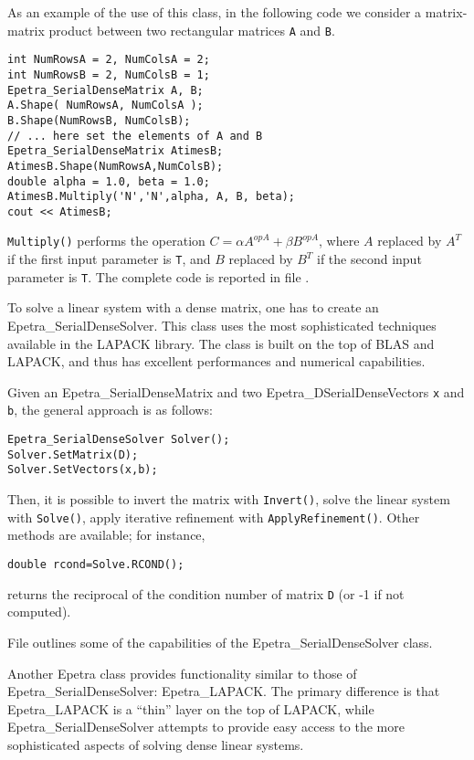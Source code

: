 As an example of the use of this class, in the following code we
consider a matrix-matrix product between two rectangular matrices
\verb!A! and \verb!B!. 
\begin{verbatim}
int NumRowsA = 2, NumColsA = 2;
int NumRowsB = 2, NumColsB = 1;
Epetra_SerialDenseMatrix A, B;
A.Shape( NumRowsA, NumColsA );
B.Shape(NumRowsB, NumColsB);
// ... here set the elements of A and B
Epetra_SerialDenseMatrix AtimesB;
AtimesB.Shape(NumRowsA,NumColsB);  
double alpha = 1.0, beta = 1.0;
AtimesB.Multiply('N','N',alpha, A, B, beta);
cout << AtimesB;
\end{verbatim}
\verb!Multiply()! performs the operation $C = \alpha A^{opA} + \beta
B^{opA}$, where $A$ replaced by $A^T$ if the first input parameter is
\verb!T!, and $B$ replaced by $B^T$ if the second input parameter is
\verb!T!.  The complete code is reported in file
.

\smallskip

To solve a linear system with a dense matrix, one has to create an
Epetra\_SerialDenseSolver. This class uses the most sophisticated
techniques available in the LAPACK library. The class is
built on the top of BLAS and LAPACK, and thus has excellent performances
and numerical capabilities.

Given an Epetra\_SerialDenseMatrix and two Epetra\_DSerialDenseVectors
{\tt x} and {\tt b}, the general approach is as follows:
\begin{verbatim}
Epetra_SerialDenseSolver Solver();
Solver.SetMatrix(D);
Solver.SetVectors(x,b);
\end{verbatim}
Then, it is possible to invert the matrix with \verb!Invert()!, solve
the linear system with \verb!Solve()!, apply iterative refinement with
\verb!ApplyRefinement()!. Other methods are available; for instance,
\begin{verbatim}
double rcond=Solve.RCOND();
\end{verbatim}
returns the reciprocal of the condition number of matrix {\tt D} (or -1
if not computed).

File  outlines some of the capabilities of the
Epetra\_SerialDenseSolver class.

\smallskip

Another Epetra class provides functionality similar to those of
Epetra\_SerialDenseSolver: Epetra\_LAPACK. The primary difference is
that Epetra\_LAPACK is a ``thin'' layer on the top of LAPACK, while
Epetra\_SerialDenseSolver attempts to provide easy access to the more
sophisticated aspects of solving dense linear systems.

